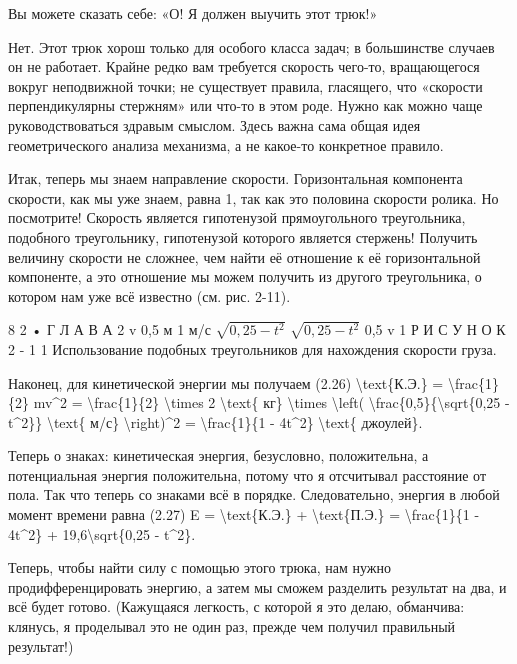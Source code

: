 \documentclass[10pt,oneside]{article}
\begin{document}
Вы можете сказать себе: «О! Я должен выучить этот трюк!»\par

Нет. Этот трюк хорош только для особого класса задач; в большинстве случаев он не работает. Крайне редко вам требуется скорость чего-то, вращающегося вокруг неподвижной точки; не существует правила, гласящего, что «скорости перпендикулярны стержням» или что-то в этом роде. Нужно как можно чаще руководствоваться здравым смыслом. Здесь важна сама общая идея геометрического анализа механизма, а не какое-то конкретное правило.\par

Итак, теперь мы знаем направление скорости. Горизонтальная компонента скорости, как мы уже знаем, равна 1, так как это половина скорости ролика. Но посмотрите! Скорость является гипотенузой прямоугольного треугольника, подобного треугольнику, гипотенузой которого является стержень! Получить величину скорости не сложнее, чем найти её отношение к её горизонтальной компоненте, а это отношение мы можем получить из другого треугольника, о котором нам уже всё известно (см. рис. 2-11).\par

8 2 • Г Л А В А  2 v 0,5 м 1 м/с \(\sqrt{0,25 - t^2}\) \(\sqrt{0,25 - t^2}\) 0,5 v 1 Р И С У Н О К  2 - 1 1 Использование подобных треугольников для нахождения скорости груза.\par

Наконец, для кинетической энергии мы получаем (2.26) \textbackslash{}text\{К.Э.\} = \textbackslash{}frac\{1\}\{2\} mv\textasciicircum{}2 = \textbackslash{}frac\{1\}\{2\} \textbackslash{}times 2 \textbackslash{}text\{ кг\} \textbackslash{}times \textbackslash{}left( \textbackslash{}frac\{0,5\}\{\textbackslash{}sqrt\{0,25 - t\textasciicircum{}2\}\} \textbackslash{}text\{ м/с\} \textbackslash{}right)\textasciicircum{}2 = \textbackslash{}frac\{1\}\{1 - 4t\textasciicircum{}2\} \textbackslash{}text\{ джоулей\}.\par

Теперь о знаках: кинетическая энергия, безусловно, положительна, а потенциальная энергия положительна, потому что я отсчитывал расстояние от пола. Так что теперь со знаками всё в порядке. Следовательно, энергия в любой момент времени равна (2.27) E = \textbackslash{}text\{К.Э.\} + \textbackslash{}text\{П.Э.\} = \textbackslash{}frac\{1\}\{1 - 4t\textasciicircum{}2\} + 19,6\textbackslash{}sqrt\{0,25 - t\textasciicircum{}2\}.\par

Теперь, чтобы найти силу с помощью этого трюка, нам нужно продифференцировать энергию, а затем мы сможем разделить результат на два, и всё будет готово. (Кажущаяся легкость, с которой я это делаю, обманчива: клянусь, я проделывал это не один раз, прежде чем получил правильный результат!)\par
\end{document}

